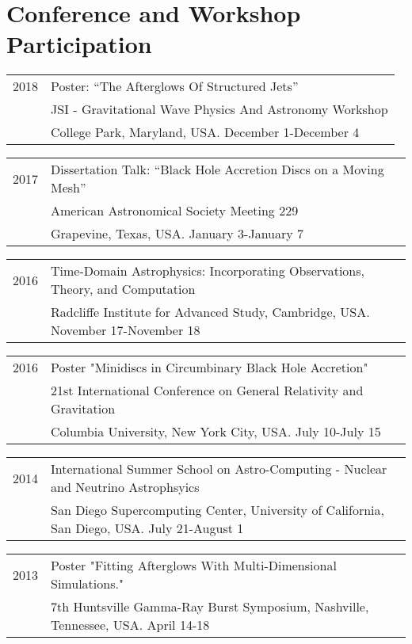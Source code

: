\documentclass[letterpaper]{article}
\renewenvironment{itemize}{
  \begin{list}{}{
    \setlength{\leftmargin}{1.5em}
  }
}{
  \end{list}
}
\begin{document}
\section*{Conference and Workshop Participation}
\begin{itemize}
\item \begin{tabular}{ll}
2018 & Poster: ``The Afterglows Of Structured Jets'' \\
	 & JSI - Gravitational Wave Physics And Astronomy Workshop \\
	 & College Park, Maryland, USA. December 1-December 4
\end{tabular}

\item \begin{tabular}{ll}
2017 & Dissertation Talk: ``Black Hole Accretion Discs on a Moving Mesh'' \\
	 & American Astronomical Society Meeting 229 \\
	 & Grapevine, Texas, USA. January 3-January 7
\end{tabular}
\item \begin{tabular}{ll}
2016 & Time-Domain Astrophysics: Incorporating Observations, Theory, and Computation \\
	 & Radcliffe Institute for Advanced Study, Cambridge, USA. November 17-November 18
\end{tabular}
\item \begin{tabular}{ll}
2016 & Poster "Minidiscs in Circumbinary Black Hole Accretion" \\
	& 21st International Conference on General Relativity and Gravitation \\ 
	& Columbia University, New York City, USA. July 10-July 15
\end{tabular}

\item \begin{tabular}{ll}
2014 & International Summer School on Astro-Computing - Nuclear and Neutrino Astrophsyics \\ 
	& San Diego Supercomputing Center, University of California, San Diego, USA. July 21-August 1
\end{tabular}

\item \begin{tabular}{ll}
2013 & Poster "Fitting Afterglows With Multi-Dimensional Simulations." \\ 
	&7th Huntsville Gamma-Ray Burst Symposium, Nashville, Tennessee, USA.  April 14-18 \\
\end{tabular}


\end{itemize}
\end{document}
